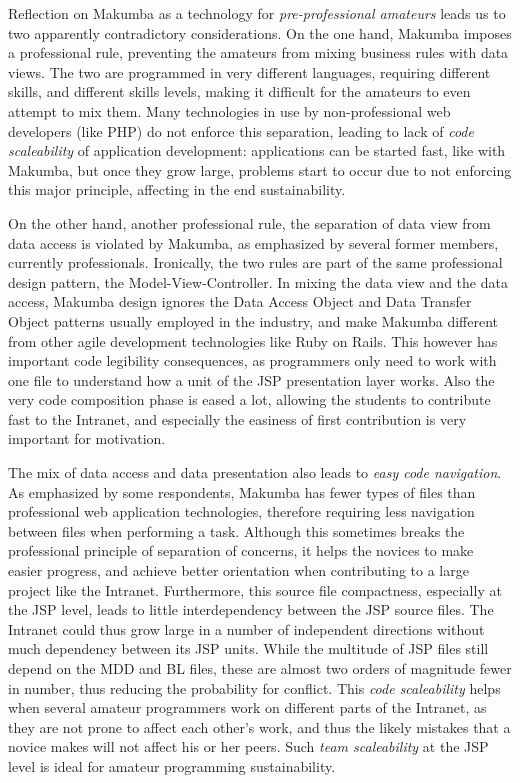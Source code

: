 \documentclass{llncs}
\begin{document}
Reflection on Makumba as a technology for \textit{pre-professional amateurs} leads us to two apparently contradictory considerations. On the one hand, Makumba imposes a professional rule, preventing the amateurs from mixing business rules with data views.  The two are programmed in very different languages, requiring different skills, and different skills levels, making  it difficult for the amateurs to even attempt to mix them. Many technologies in use by non-professional web developers (like PHP) do not enforce this separation, leading to lack of \textit{code scaleability} of application development: applications can be started fast, like with Makumba, but once they grow large, problems start to occur due to not enforcing this major principle, affecting in the end sustainability.  

On the other hand, another professional rule, the separation of data view from data access is violated by Makumba, as emphasized by several former members, currently professionals. Ironically, the two rules are part of the same professional design pattern, the Model-View-Controller. In mixing the data view and the data access, Makumba design ignores the Data Access Object and Data Transfer Object patterns usually employed in the industry, and make Makumba different from other agile development technologies like Ruby on Rails. This however has important code legibility consequences, as programmers only need to work with one file to understand how a unit of the JSP presentation layer works. Also the very code composition phase is eased a lot, allowing the students to contribute fast to the Intranet, and especially the easiness of first contribution is very important for motivation. 

The mix of data access and data presentation also leads to \textit{easy code navigation}.  As emphasized by some respondents, Makumba has fewer types of files than professional web application technologies, therefore requiring less navigation between files when performing a task. Although this sometimes breaks the professional principle of separation of concerns, it helps the novices to make easier progress, and achieve better orientation when contributing to a large project like the Intranet. Furthermore, this source file compactness, especially at the JSP level, leads to little interdependency between the JSP source files. The Intranet could thus grow large in a number of independent directions without much dependency between its JSP units. While the multitude of JSP files still depend on the MDD and BL files, these are almost two orders of magnitude fewer in number, thus reducing the probability for conflict. This \textit{code scaleability}  helps when several amateur programmers work on different parts of the Intranet, as they are not prone to affect each other's work, and thus the likely mistakes that a novice makes will not affect his or her peers. Such \textit{team scaleability} at the JSP level is ideal for amateur programming sustainability.
\end{document}
